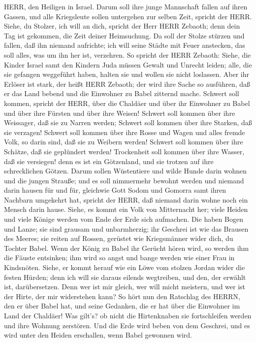 HERR, den Heiligen in Israel.  Darum soll ihre junge
Mannschaft fallen auf ihren Gassen, und alle Kriegsleute sollen
untergehen zur selben Zeit, spricht der HERR.  Siehe, du
Stolzer, ich will an dich, spricht der Herr HERR Zebaoth; denn dein Tag
ist gekommen, die Zeit deiner Heimsuchung.  Da soll der
Stolze stürzen und fallen, daß ihn niemand aufrichte; ich will seine
Städte mit Feuer anstecken, das soll alles, was um ihn her ist,
verzehren.  So spricht der HERR Zebaoth: Siehe, die Kinder
Israel samt den Kindern Juda müssen Gewalt und Unrecht leiden; alle, die
sie gefangen weggeführt haben, halten sie und wollen sie nicht
loslassen.  Aber ihr Erlöser ist stark, der heißt HERR
Zebaoth; der wird ihre Sache so ausführen, daß er das Land bebend und
die Einwohner zu Babel zitternd mache.  Schwert soll
kommen, spricht der HERR, über die Chaldäer und über ihr Einwohner zu
Babel und über ihre Fürsten und über ihre Weisen!  Schwert
soll kommen über ihre Weissager, daß sie zu Narren werden; Schwert soll
kommen über ihre Starken, daß sie verzagen!  Schwert soll
kommen über ihre Rosse und Wagen und alles fremde Volk, so darin sind,
daß sie zu Weibern werden! Schwert soll kommen über ihre Schätze, daß
sie geplündert werden!  Trockenheit soll kommen über ihre
Wasser, daß sie versiegen! denn es ist ein Götzenland, und sie trotzen
auf ihre schrecklichen Götzen.  Darum sollen Wüstentiere
und wilde Hunde darin wohnen und die jungen Strauße; und es soll
nimmermehr bewohnt werden und niemand darin hausen für und für,
 gleichwie Gott Sodom und Gomorra samt ihren Nachbarn
umgekehrt hat, spricht der HERR, daß niemand darin wohne noch ein Mensch
darin hause.  Siehe, es kommt ein Volk von Mitternacht her;
viele Heiden und viele Könige werden vom Ende der Erde sich aufmachen.
 Die haben Bogen und Lanze; sie sind grausam und
unbarmherzig; ihr Geschrei ist wie das Brausen des Meeres; sie reiten
auf Rossen, gerüstet wie Kriegsmänner wider dich, du Tochter Babel.
 Wenn der König zu Babel ihr Gerücht hören wird, so werden
ihm die Fäuste entsinken; ihm wird so angst und bange werden wie einer
Frau in Kindsnöten.  Siehe, er kommt herauf wie ein Löwe
vom stolzen Jordan wider die festen Hürden; denn ich will sie daraus
eilends wegtreiben, und den, der erwählt ist, darübersetzen. Denn wer
ist mir gleich, wer will micht meistern, und wer ist der Hirte, der mir
widerstehen kann?  So hört nun den Ratschlag des HERRN, den
er über Babel hat, und seine Gedanken, die er hat über die Einwohner im
Land der Chaldäer! Was gilt's? ob nicht die Hirtenknaben sie
fortschleifen werden und ihre Wohnung zerstören.  Und die
Erde wird beben von dem Geschrei, und es wird unter den Heiden
erschallen, wenn Babel gewonnen wird.

